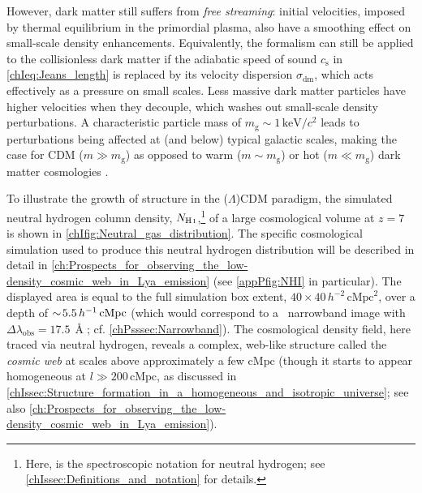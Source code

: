 However, dark matter still suffers from \textit{free streaming}: initial velocities, imposed by thermal equilibrium in the primordial plasma, also have a smoothing effect on small-scale density enhancements. Equivalently, the \citeauthor{1902RSPTA.199....1J} formalism can still be applied to the collisionless dark matter if the adiabatic speed of sound $c_\text{s}$ in \cref{chIeq:Jeans_length} is replaced by its velocity dispersion $\sigma_\text{dm}$, which acts effectively as a pressure on small scales. Less massive dark matter particles have higher velocities when they decouple, which washes out small-scale density perturbations. A characteristic particle mass of $m_\text{g} \sim 1 \, \mathrm{keV}/c^2$ leads to perturbations being affected at (and below) typical galactic scales, making the case for CDM ($m \gg m_\text{g}$) as opposed to warm ($m \sim m_\text{g}$) or hot ($m \ll m_\text{g}$) dark matter cosmologies \citep[e.g.][]{1982ApJ...263L...1P}.

To illustrate the growth of structure in the ($\Lambda$)CDM paradigm, the simulated neutral hydrogen column density, $N_\text{\ion{H}{I}}$,\footnote{Here,  is the spectroscopic notation for neutral hydrogen; see \cref{chIssec:Definitions_and_notation} for details.} of a large cosmological volume at $z = 7$ is shown in \cref{chIfig:Neutral_gas_distribution}. The specific cosmological simulation used to produce this neutral hydrogen distribution will be described in detail in \cref{ch:Prospects_for_observing_the_low-density_cosmic_web_in_Lya_emission} (see \cref{appPfig:NHI} in particular). The displayed area is equal to the full simulation box extent, $40 \times 40 \, h^{-2} \, \mathrm{cMpc}^2$, over a depth of $\sim \! 5.5 \, h^{-1} \, \mathrm{cMpc}$ (which would correspond to a \lymana\ narrowband image with $\Delta \lambda_\text{obs} = 17.5 \, \Angstrom$; cf. \cref{chPsssec:Narrowband}). The cosmological density field, here traced via neutral hydrogen, reveals a complex, web-like structure called the \textit{cosmic web} at scales above approximately a few $\mathrm{cMpc}$ (though it starts to appear homogeneous at $l \gg 200 \, \mathrm{cMpc}$, as discussed in \cref{chIssec:Structure_formation_in_a_homogeneous_and_isotropic_universe}; see also \cref{ch:Prospects_for_observing_the_low-density_cosmic_web_in_Lya_emission}).

